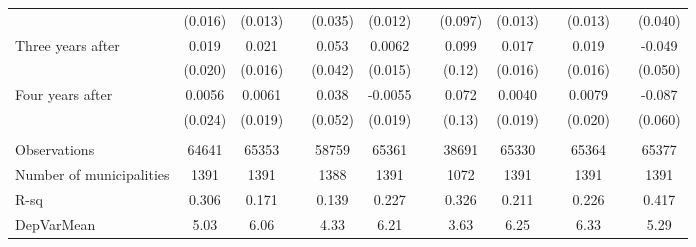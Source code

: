 \begin{tabular}{lcccccccccccc}
      & (0.016) & (0.013) &       & (0.035) & (0.012) &       & (0.097) & (0.013) &       & (0.013) &       & (0.040) \\
Three years after & 0.019 & 0.021 &       & 0.053 & 0.0062 &       & 0.099 & 0.017 &       & 0.019 &       & -0.049 \\
      & (0.020) & (0.016) &       & (0.042) & (0.015) &       & (0.12) & (0.016) &       & (0.016) &       & (0.050) \\
Four years after & 0.0056 & 0.0061 &       & 0.038 & -0.0055 &       & 0.072 & 0.0040 &       & 0.0079 &       & -0.087 \\
      & (0.024) & (0.019) &       & (0.052) & (0.019) &       & (0.13) & (0.019) &       & (0.020) &       & (0.060) \\
      &       &       &       &       &       &       &       &       &       &       &       &  \\
\midrule
Observations & 64641 & 65353 &       & 58759 & 65361 &       & 38691 & 65330 &       & 65364 &       & 65377 \\
Number of municipalities & 1391  & 1391  &       & 1388  & 1391  &       & 1072  & 1391  &       & 1391  &       & 1391 \\
R-sq  & 0.306 & 0.171 &       & 0.139 & 0.227 &       & 0.326 & 0.211 &       & 0.226 &       & 0.417 \\
DepVarMean & 5.03  & 6.06  &       & 4.33  & 6.21  &       & 3.63  & 6.25  &       & 6.33  &       & 5.29 \\
\bottomrule
\bottomrule
\end{tabular}%
